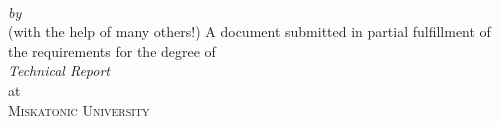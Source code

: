 \begin{titlepage}
  \vspace*{5cm}
  \makeatletter
  \begin{center}
    \begin{Huge}
      \@title
    \end{Huge}\\[0.1cm]
    \ifdefempty{\@subtitle}{}{%
      \begin{Large}
        \@subtitle
      \end{Large}\\
    }
    \emph{by}\\
    \@author\space(with the help of many others!)
    \vfill
    A document submitted in partial fulfillment
    of the requirements for the degree of\\
    \emph{Technical Report}\\
    at\\
    \textsc{Miskatonic University}
  \end{center}
  \makeatother
\end{titlepage}

\newpage
\null
\thispagestyle{empty}
\newpage
